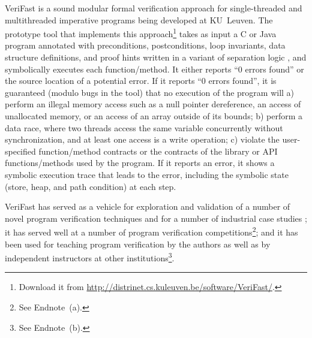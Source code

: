 \documentclass{CSML}
\theoremstyle{definition}\newtheorem{notation}[thm]{Notation}
\theoremstyle{plain}\newtheorem{satz}[thm]{Satz}
\begin{document}
VeriFast is a sound modular formal verification approach for 
single-threaded and multithreaded imperative programs being 
developed at KU~Leuven. The prototype tool that implements this 
approach\footnote{Download it from \url{http://distrinet.cs.kuleuven.be/software/VeriFast/}.} takes as input a C or Java program annotated with 
preconditions, postconditions, loop invariants, data structure 
definitions, and proof hints written in a variant of separation 
logic \cite{seplogic-ohearn,seplogic}, and symbolically executes each function/method. It 
either reports ``0 errors found'' or the source location of a 
potential error. If it reports ``0 errors found'', it is 
guaranteed (modulo bugs in the tool) that no execution of the program will a) perform an 
illegal memory access such as a null pointer dereference, 
an access of unallocated memory, or an access of an array outside of 
its bounds; b) perform a data race, where two threads access 
the same variable concurrently without synchronization, and at 
least one access is a write operation; c) violate the 
user-specified function/method contracts or the contracts of 
the library or API functions/methods used by the program. If it 
reports an error, it shows a symbolic execution trace that 
leads to the error, including the symbolic state (store, heap, 
and path condition) at each step. 

VeriFast has served as a vehicle for exploration and validation of a 
number of novel program verification techniques 
\cite{DBLP:conf/popl/JacobsP11,DBLP:conf/fm/JacobsSP11,DBLP:conf/forte/VogelsJPS11,DBLP:conf/sefm/VanspauwenJ13} 
and for a number of industrial case studies \cite{Philippaerts2013}; it 
has served well at a number of program verification 
competitions\footnote{See Endnote~(a).}; and it has been used 
for teaching program verification by the authors as well as by independent 
instructors at other institutions\footnote{See Endnote~(b).}. 
\end{document}
